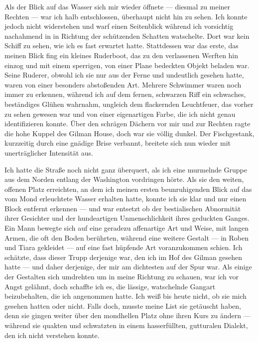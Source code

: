 Als der Blick auf das Wasser sich mir wieder öffnete --- diesmal zu meiner Rechten --- war ich halb entschlossen, überhaupt nicht hin zu sehen. Ich konnte jedoch nicht widerstehen und warf einen Seitenblick während ich vorsichtig nachahmend in in Richtung der schützenden Schatten watschelte. Dort war kein Schiff zu sehen, wie ich es fast erwartet hatte. Stattdessen war das erste, das meinen Blick fing ein kleines Ruderboot, das zu den verlassenen Werften hin einzog und mit einem sperrigen, von einer Plane bedeckten Objekt beladen war. Seine Ruderer, obwohl ich sie nur aus der Ferne und undeutlich gesehen hatte, waren von einer besonders abstoßenden Art. Mehrere Schwimmer waren noch immer zu erkennen, während ich auf dem fernen, schwarzen Riff ein schwaches, beständiges Glühen wahrnahm, ungleich dem flackernden Leuchtfeuer, das vorher zu sehen gewesen war und von einer eigenartigen Farbe, die ich nicht genau identifizieren konnte. Über den schrägen Dächern vor mir und zur Rechten ragte die hohe Kuppel des Gilman House, doch war sie völlig dunkel. Der Fischgestank, kurzzeitig durch eine gnädige Brise verbannt, breitete sich nun wieder mit unerträglicher Intensität aus.

Ich hatte die Straße noch nicht ganz überquert, als ich eine murmelnde Gruppe aus dem Norden entlang der Washington vordringen hörte. Als sie den weiten, offenen Platz erreichten, an dem ich meinen ersten beunruhigenden Blick auf das vom Mond erleuchtete Wasser erhalten hatte, konnte ich sie klar und nur einen Block entfernt erkennen --- und war entsetzt ob der bestialischen Abnormität ihrer Gesichter und der hundeartigen Unmenschlichkeit ihres geduckten Ganges. Ein Mann bewegte sich auf eine geradezu affenartige Art und Weise, mit langen Armen, die oft den Boden berührten, während eine weitere Gestalt --- in Roben und Tiara gekleidet --- auf eine fast hüpfende Art voranzukommen schien. Ich schätzte, dass dieser Trupp derjenige war, den ich im Hof des Gilman gesehen hatte --- und daher derjenige, der mir am dichtesten auf der Spur war. Als einige der Gestalten sich umdrehten um in meine Richtung zu schauen, war ich vor Angst gelähmt, doch schaffte ich es, die lässige, watschelnde Gangart beizubehalten, die ich angenommen hatte. Ich weiß bis heute nicht, ob sie mich gesehen hatten oder nicht. Falls doch, musste meine List sie getäuscht haben, denn sie gingen weiter über den mondhellen Platz ohne ihren Kurs zu ändern --- während sie quakten und schwatzten in einem hasserfüllten, gutturalen Dialekt, den ich nicht verstehen konnte.

